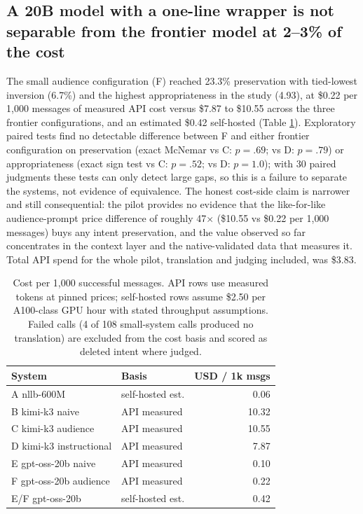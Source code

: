 \documentclass[11pt]{article}
\begin{document}
\subsection{A 20B model with a one-line wrapper is not separable from the frontier model at 2--3\% of the cost}
The small audience configuration (F) reached 23.3\% preservation with tied-lowest inversion (6.7\%) and the highest appropriateness in the study (4.93), at \$0.22 per 1{,}000 messages of measured API cost versus \$7.87 to \$10.55 across the three frontier configurations, and an estimated \$0.42 self-hosted (Table \ref{tab:costs}). Exploratory paired tests find no detectable difference between F and either frontier configuration on preservation (exact McNemar vs C: $p=.69$; vs D: $p=.79$) or appropriateness (exact sign test vs C: $p=.52$; vs D: $p=1.0$); with 30 paired judgments these tests can only detect large gaps, so this is a failure to separate the systems, not evidence of equivalence. The honest cost-side claim is narrower and still consequential: the pilot provides no evidence that the like-for-like audience-prompt price difference of roughly 47$\times$ (\$10.55 vs \$0.22 per 1{,}000 messages) buys any intent preservation, and the value observed so far concentrates in the context layer and the native-validated data that measures it. Total API spend for the whole pilot, translation and judging included, was \$3.83.

\begin{table}[t]
\centering\small
\begin{tabular}{llr}
\toprule
System & Basis & USD / 1k msgs \\
\midrule
A nllb-600M & self-hosted est. & 0.06 \\
B kimi-k3 naive & API measured & 10.32 \\
C kimi-k3 audience & API measured & 10.55 \\
D kimi-k3 instructional & API measured & 7.87 \\
E gpt-oss-20b naive & API measured & 0.10 \\
F gpt-oss-20b audience & API measured & 0.22 \\
E/F gpt-oss-20b & self-hosted est. & 0.42 \\
\bottomrule
\end{tabular}
\caption{Cost per 1{,}000 successful messages. API rows use measured tokens at pinned prices; self-hosted rows assume \$2.50 per A100-class GPU hour with stated throughput assumptions. Failed calls (4 of 108 small-system calls produced no translation) are excluded from the cost basis and scored as deleted intent where judged.}
\label{tab:costs}
\end{table}
\end{document}
